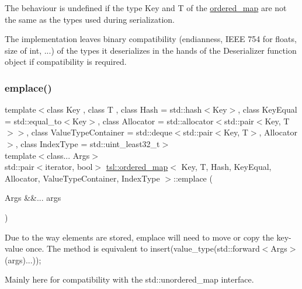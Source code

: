 The behaviour is undefined if the type {\ttfamily Key} and {\ttfamily T} of the {\ttfamily \mbox{\hyperlink{classtsl_1_1ordered__map}{ordered\+\_\+map}}} are not the same as the types used during serialization.

The implementation leaves binary compatibility (endianness, I\+E\+EE 754 for floats, size of int, ...) of the types it deserializes in the hands of the {\ttfamily Deserializer} function object if compatibility is required. \mbox{\label{classtsl_1_1ordered__map_a817ba103f9be8980eed8da481902c144}} 
\subsubsection{\texorpdfstring{emplace()}{emplace()}}
{\footnotesize\ttfamily template$<$class Key , class T , class Hash  = std\+::hash$<$\+Key$>$, class Key\+Equal  = std\+::equal\+\_\+to$<$\+Key$>$, class Allocator  = std\+::allocator$<$std\+::pair$<$\+Key, T$>$$>$, class Value\+Type\+Container  = std\+::deque$<$std\+::pair$<$\+Key, T$>$, Allocator$>$, class Index\+Type  = std\+::uint\+\_\+least32\+\_\+t$>$ \\
template$<$class... Args$>$ \\
std\+::pair$<$iterator, bool$>$ \mbox{\hyperlink{classtsl_1_1ordered__map}{tsl\+::ordered\+\_\+map}}$<$ Key, T, Hash, Key\+Equal, Allocator, Value\+Type\+Container, Index\+Type $>$\+::emplace (\begin{DoxyParamCaption}\item[{Args \&\&...}]{args }\end{DoxyParamCaption})\hspace{0.3cm}{\ttfamily [inline]}}

Due to the way elements are stored, emplace will need to move or copy the key-\/value once. The method is equivalent to insert(value\+\_\+type(std\+::forward$<$\+Args$>$(args)...));

Mainly here for compatibility with the std\+::unordered\+\_\+map interface. \mbox{\label{classtsl_1_1ordered__map_aef1892adae2cbc052239c3580ba004c5}} 
